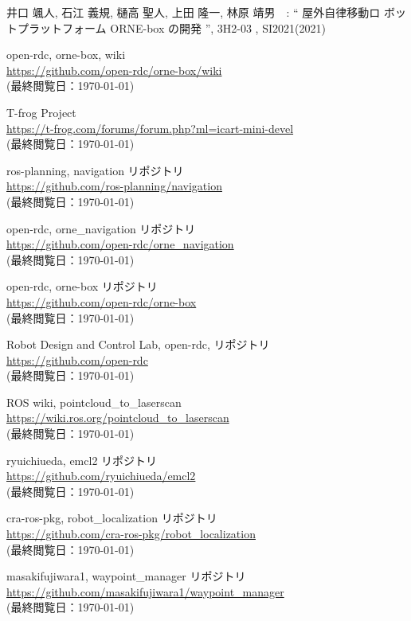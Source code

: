 \documentclass[twocolumn, 9pt]{jsproceedings}
\begin{document}
\footnotesize
\begin{thebibliography}{99}

井口 颯人, 石江 義規, 樋高 聖人, 上田 隆一, 林原 靖男　: “ 屋外自律移動ロ
ボットプラットフォーム ORNE-box の開発 ”, 3H2-03 , SI2021(2021)

open-rdc, orne-box, wiki\\
\url{https://github.com/open-rdc/orne-box/wiki}\\
(最終閲覧日：\today)

T-frog Project\\
\url{https://t-frog.com/forums/forum.php?ml=icart-mini-devel}\\
(最終閲覧日：\today)

ros-planning, navigation リポジトリ\\
\url{https://github.com/ros-planning/navigation}\\
(最終閲覧日：\today)

open-rdc, orne\_navigation リポジトリ\\
\url{https://github.com/open-rdc/orne_navigation}\\
(最終閲覧日：\today)

open-rdc, orne-box リポジトリ\\
\url{https://github.com/open-rdc/orne-box}\\
(最終閲覧日：\today)

Robot Design and Control Lab, open-rdc, リポジトリ\\
\url{https://github.com/open-rdc}\\
(最終閲覧日：\today)

ROS wiki, pointcloud\_to\_laserscan\\
\url{https://wiki.ros.org/pointcloud_to_laserscan}\\
(最終閲覧日：\today)

ryuichiueda, emcl2 リポジトリ\\
\url{https://github.com/ryuichiueda/emcl2}\\
(最終閲覧日：\today)

cra-ros-pkg, robot\_localization リポジトリ\\
\url{https://github.com/cra-ros-pkg/robot_localization}\\
(最終閲覧日：\today)

masakifujiwara1, waypoint\_manager リポジトリ\\
\url{https://github.com/masakifujiwara1/waypoint_manager}\\
(最終閲覧日：\today)


\end{thebibliography}
\end{document}

